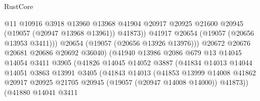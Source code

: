 \begin{lexlean}{RustCore}
\begin{coremodule}
                                        @11
                                        @10916
                                        @3918
                                        @13960
                                        @13968
                                        @41904
                                        @20917
                                        @20925
                                        @21600
                                        @20945
                                        (@19057 (@20947 @13968 @13961))
                                        @41873))
                                    @41917
                                    @20654
                                    (@19057 (@20656 @13953 @3411)))
                                  @20654
                                  (@19057 (@20656 @13926 @13976)))
                                @20672
                                @20676
                                @20681
                                @20686
                                @20692
                                @36040)
                              (@41940
                                @13986
                                @2086
                                @679
                                @13
                                @14045
                                @14054
                                @3411
                                @3905
                                (@41826
                                  @14045
                                  @14052
                                  @3887
                                  (@41834
                                    @14013
                                    @14044
                                    @14051
                                    @3863
                                    @13991
                                    @3405
                                    (@41843
                                      @14013
                                      (@41853
                                        @13999
                                        @14008
                                        @41862
                                        @20917
                                        @20925
                                        @21705
                                        @20945
                                        (@19057 (@20947 @14008 @14000))
                                        @41873))
                                    (@41880
                                      @14041
                                      @3411

\end{coremodule}
\end{lexlean}
